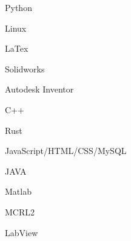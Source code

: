 \vspace{0.4cm}
\begin{cSection}{\textwidth}{0.47\textwidth}{0.48\textwidth}
{%
\begin{cSubsection}{}
  \begin{experienceItem} {}{Python}{}{} \end{experienceItem}
  \begin{experienceItem} {\hphantom{}}{Linux}{}{} \end{experienceItem}
  \begin{experienceItem} {\hphantom{}}{LaTex}{}{} \end{experienceItem}
  \begin{experienceItem} {\hphantom{}}{Solidworks}{}{} \end{experienceItem}
  \begin{experienceItem} {\hphantom{}}{Autodesk Inventor}{}{} \end{experienceItem}

  \begin{experienceItem} {}{C++}{}{} \end{experienceItem}
  \begin{experienceItem} {\hphantom{}}{Rust}{}{} \end{experienceItem}
  \begin{experienceItem} {\hphantom{}}{JavaScript/HTML/CSS/MySQL}{}{} \end{experienceItem}
  \begin{experienceItem} {\hphantom{}}{JAVA}{}{} \end{experienceItem}
  \begin{experienceItem} {\hphantom{}}{Matlab}{}{} \end{experienceItem}
  \begin{experienceItem} {\hphantom{}}{MCRL2}{}{} \end{experienceItem}
  \begin{experienceItem} {\hphantom{}}{LabView}{}{} \end{experienceItem}
\end{cSubsection}


}
\end{cSection}
